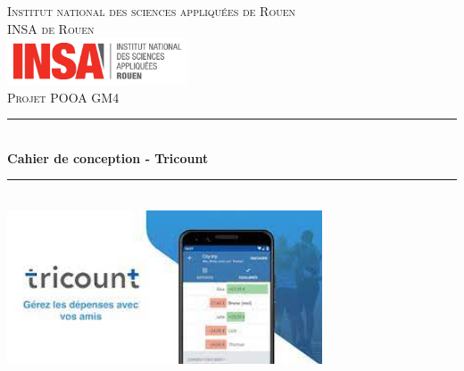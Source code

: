 \documentclass[12,french]{report}
\newcommand{\HRule}{\rule{\linewidth}{0.5mm}}
\begin{document}
\hypersetup{pdfborder=0 0 0}

\begin{titlepage}

\begin{center}
	\textsc{{\LARGE Institut national des sciences appliquées de Rouen} \\ 			\vspace{6mm} {\Large INSA de Rouen}} \\
	\vspace{5mm}
	\includegraphics[width=0.4\textwidth]{./Images/insa}\\[1.0 cm]

	\textsc{\Large Projet POOA GM4}\\[0.6cm]

	\HRule \\[0.5cm]
	{ \Huge \bfseries Cahier de conception - Tricount}\\[0.2cm]
	\HRule \\[0.75cm]

	\includegraphics[width=0.7\textwidth]{./Images/Tricount}\\[0.9 cm]


\end{center}
\end{titlepage}
\end{document}
